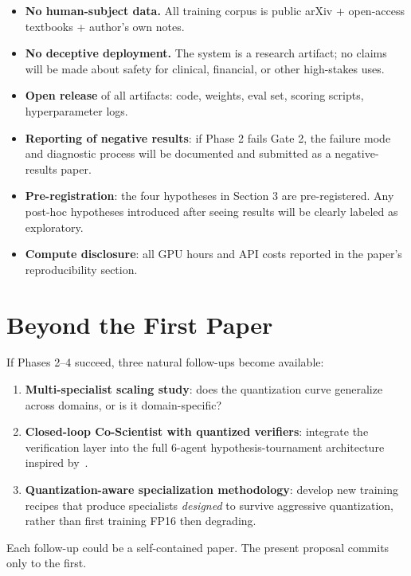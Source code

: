 \documentclass[11pt]{article}
\begin{document}
\begin{itemize}
  \item \textbf{No human-subject data.} All training corpus is public arXiv + open-access textbooks + author's own notes.
  \item \textbf{No deceptive deployment.} The system is a research artifact; no claims will be made about safety for clinical, financial, or other high-stakes uses.
  \item \textbf{Open release} of all artifacts: code, weights, eval set, scoring scripts, hyperparameter logs.
  \item \textbf{Reporting of negative results}: if Phase 2 fails Gate 2, the failure mode and diagnostic process will be documented and submitted as a negative-results paper.
  \item \textbf{Pre-registration}: the four hypotheses in Section 3 are pre-registered. Any post-hoc hypotheses introduced after seeing results will be clearly labeled as exploratory.
  \item \textbf{Compute disclosure}: all GPU hours and API costs reported in the paper's reproducibility section.
\end{itemize}

\section{Beyond the First Paper}

If Phases 2--4 succeed, three natural follow-ups become available:
\begin{enumerate}
  \item \textbf{Multi-specialist scaling study}: does the quantization curve generalize across domains, or is it domain-specific?
  \item \textbf{Closed-loop Co-Scientist with quantized verifiers}: integrate the verification layer into the full 6-agent hypothesis-tournament architecture inspired by~\cite{gottweis2025coscientist}.
  \item \textbf{Quantization-aware specialization methodology}: develop new training recipes that produce specialists \emph{designed} to survive aggressive quantization, rather than first training FP16 then degrading.
\end{enumerate}

Each follow-up could be a self-contained paper. The present proposal commits only to the first.

\printbibliography[heading=bibnumbered, title={References}]
\end{document}
